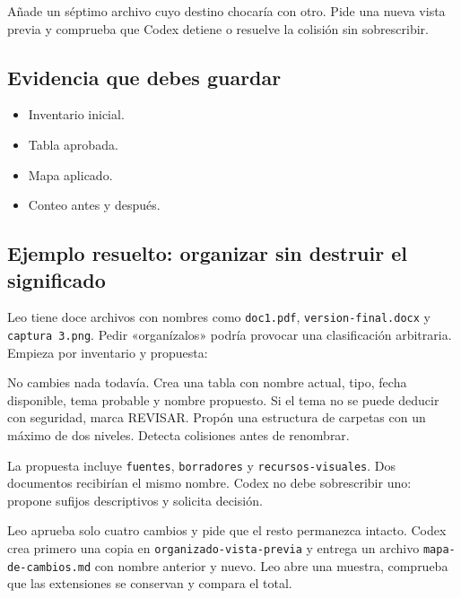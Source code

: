 \documentclass[10pt,a4paper,openany]{book}
\providecommand{\tightlist}{\setlength{\itemsep}{0.18em}\setlength{\parskip}{0pt}}
\newenvironment{Shaded}{}{}
\newcommand{\NormalTok}[1]{#1}
\renewenvironment{Shaded}
  {\begin{tcolorbox}[
    enhanced,
    breakable,
    colback=CodeBg,
    colframe=Border,
    boxrule=0.5pt,
    arc=2mm,
    left=3mm,
    right=3mm,
    top=2.2mm,
    bottom=2.2mm,
    before skip=0.8em,
    after skip=0.9em
  ]}
  {\end{tcolorbox}}
\begin{document}
Añade un séptimo archivo cuyo destino chocaría con otro. Pide una nueva
vista previa y comprueba que Codex detiene o resuelve la colisión sin
sobrescribir.

\subsection{Evidencia que debes
guardar}\label{evidencia-que-debes-guardar-6}

\begin{itemize}
\tightlist
\item
  Inventario inicial.
\item
  Tabla aprobada.
\item
  Mapa aplicado.
\item
  Conteo antes y después.
\end{itemize}

\subsection{Ejemplo resuelto: organizar sin destruir el
significado}\label{ejemplo-resuelto-organizar-sin-destruir-el-significado}

Leo tiene doce archivos con nombres como \texttt{doc1.pdf},
\texttt{version-final.docx} y \texttt{captura\ 3.png}. Pedir
«organízalos» podría provocar una clasificación arbitraria. Empieza por
inventario y propuesta:

\begin{Shaded}
\begin{Highlighting}[]
\NormalTok{No cambies nada todavía. Crea una tabla con nombre actual, tipo,}
\NormalTok{fecha disponible, tema probable y nombre propuesto. Si el tema no se}
\NormalTok{puede deducir con seguridad, marca REVISAR. Propón una estructura de}
\NormalTok{carpetas con un máximo de dos niveles. Detecta colisiones antes de renombrar.}
\end{Highlighting}
\end{Shaded}

La propuesta incluye \texttt{fuentes}, \texttt{borradores} y
\texttt{recursos-visuales}. Dos documentos recibirían el mismo nombre.
Codex no debe sobrescribir uno: propone sufijos descriptivos y solicita
decisión.

Leo aprueba solo cuatro cambios y pide que el resto permanezca intacto.
Codex crea primero una copia en \texttt{organizado-vista-previa} y
entrega un archivo \texttt{mapa-de-cambios.md} con nombre anterior y
nuevo. Leo abre una muestra, comprueba que las extensiones se conservan
y compara el total.
\end{document}
